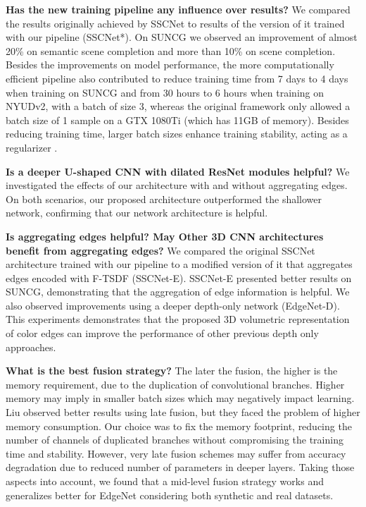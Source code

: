 \textbf{Has the new training pipeline any influence over results?}
We compared the results originally achieved by SSCNet to results of the version of it trained with our pipeline (SSCNet*). On SUNCG we observed an  improvement of almost 20\% on semantic scene completion and more than 10\% on scene completion. Besides the improvements on model performance, the more computationally efficient pipeline also contributed to reduce training time from 7 days to 4 days when training on SUNCG and from 30 hours to 6 hours when training on NYUDv2, with a batch of size 3, whereas the original framework only allowed a batch size of 1 sample on a GTX 1080Ti (which has 11GB of memory). Besides reducing training time, larger batch sizes enhance training stability, acting as a regularizer \cite{smith_2018_batch_size}.  

\textbf{Is a deeper U-shaped CNN with dilated ResNet modules helpful?}
We investigated the effects of our architecture with and without aggregating edges. On both scenarios, our proposed architecture outperformed the shallower network, confirming that our network architecture is helpful.



\textbf{Is aggregating edges helpful? May Other 3D CNN architectures benefit from aggregating edges?}
We compared the original SSCNet architecture trained with our pipeline to a modified version of it that aggregates edges encoded with F-TSDF (SSCNet-E). SSCNet-E presented better results on SUNCG, demonstrating that the aggregation of edge information is helpful. We also observed improvements using a deeper depth-only network (EdgeNet-D). 
This experiments demonstrates that the proposed 3D volumetric representation of color edges can improve the performance of other previous depth only approaches.

\textbf{What is the best fusion strategy?}
The later the fusion, the higher is the memory requirement, due to the duplication of convolutional branches. Higher memory may imply in smaller batch sizes which may negatively impact learning. Liu \etal\cite{See_and_think_2018} observed better results using late fusion, but they faced the problem of higher memory consumption. Our choice was to fix the memory footprint, reducing the number of channels of duplicated branches without compromising the training time and stability.  However, very late fusion schemes may suffer from accuracy degradation due to reduced number of parameters in deeper layers. Taking those aspects into account, we found that a mid-level fusion strategy works and generalizes better for EdgeNet considering both synthetic and real datasets. 


